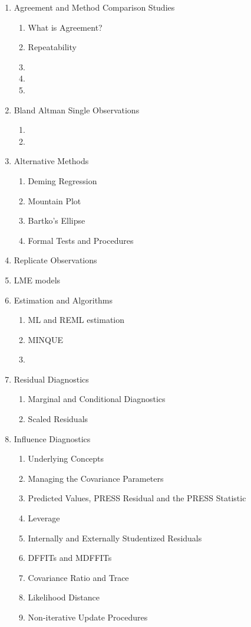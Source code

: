 \documentclass[12pt, a4paper]{report}
\theoremstyle{plain}
\theoremstyle{definition}
\theoremstyle{remark}
\begin{document}
\begin{enumerate}
	\item Agreement and Method Comparison Studies
	\begin{enumerate}
		\item What is Agreement?
		\item Repeatability
		\item
		\item
		\item
	\end{enumerate}
	\item Bland Altman Single Observations
	\begin{enumerate}
		\item
		\item
	\end{enumerate}
	\item Alternative Methods
	\begin{enumerate}
		\item Deming Regression
		\item Mountain Plot
		\item Bartko's Ellipse
		\item Formal Tests and Procedures
	\end{enumerate}
	\item Replicate Observations
	
	\item LME models
	
	\item Estimation and Algorithms
	\begin{enumerate}
		\item ML and REML estimation
		\item MINQUE
		\item
	\end{enumerate}
	\item Residual Diagnostics
	\begin{enumerate}
		\item Marginal and Conditional Diagnostics
		\item Scaled Residuals
	\end{enumerate}
	
	\item Influence Diagnostics
	\begin{enumerate}
		\item Underlying Concepts
		\item Managing the Covariance Parameters
		\item Predicted Values, PRESS Residual and the PRESS Statistic
		\item Leverage
		\item Internally and Externally Studentized Residuals
		\item DFFITs and MDFFITs
		\item Covariance Ratio and Trace
		\item Likelihood Distance
		\item Non-iterative Update Procedures
	\end{enumerate}
\end{enumerate}
\newpage
\end{document}
